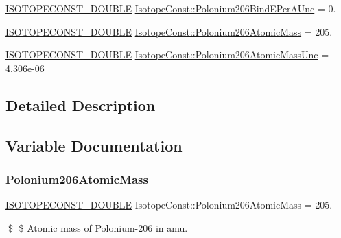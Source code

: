 \begin{DoxyCompactItemize}
\mbox{\hyperlink{group___isotope_const-_macros_ga8f45a7272ce02c0b4c65c44636ed719a}{I\+S\+O\+T\+O\+P\+E\+C\+O\+N\+S\+T\+\_\+\+D\+O\+U\+B\+LE}} \mbox{\hyperlink{group___isotope_const-_polonium-_po206_gaf0346d169a3274a3e4e7b45aef98c4ba}{Isotope\+Const\+::\+Polonium206\+Bind\+E\+Per\+A\+Unc}} = 0.
\item 
\mbox{\hyperlink{group___isotope_const-_macros_ga8f45a7272ce02c0b4c65c44636ed719a}{I\+S\+O\+T\+O\+P\+E\+C\+O\+N\+S\+T\+\_\+\+D\+O\+U\+B\+LE}} \mbox{\hyperlink{group___isotope_const-_polonium-_po206_gac2282221571c7087990f9b408923232a}{Isotope\+Const\+::\+Polonium206\+Atomic\+Mass}} = 205.
\item 
\mbox{\hyperlink{group___isotope_const-_macros_ga8f45a7272ce02c0b4c65c44636ed719a}{I\+S\+O\+T\+O\+P\+E\+C\+O\+N\+S\+T\+\_\+\+D\+O\+U\+B\+LE}} \mbox{\hyperlink{group___isotope_const-_polonium-_po206_gab675efb2f1714acea074b5b230d48107}{Isotope\+Const\+::\+Polonium206\+Atomic\+Mass\+Unc}} = 4.\+306e-\/06
\end{DoxyCompactItemize}


\subsection{Detailed Description}


\subsection{Variable Documentation}
\mbox{\label{group___isotope_const-_polonium-_po206_gac2282221571c7087990f9b408923232a}} 
\subsubsection{\texorpdfstring{Polonium206\+Atomic\+Mass}{Polonium206AtomicMass}}
{\footnotesize\ttfamily \mbox{\hyperlink{group___isotope_const-_macros_ga8f45a7272ce02c0b4c65c44636ed719a}{I\+S\+O\+T\+O\+P\+E\+C\+O\+N\+S\+T\+\_\+\+D\+O\+U\+B\+LE}} Isotope\+Const\+::\+Polonium206\+Atomic\+Mass = 205.}

\$ \$ Atomic mass of Polonium-\/206 in amu. \mbox{\label{group___isotope_const-_polonium-_po206_gab675efb2f1714acea074b5b230d48107}} 
